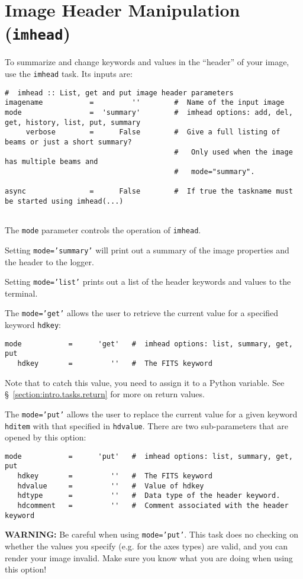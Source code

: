 \section{Image Header Manipulation ({\tt imhead})}
\label{section:analysis.imhead}

To summarize and change keywords and values in the ``header'' of
your image, use the {\tt imhead} task.  Its inputs are:
\small
\begin{verbatim}
#  imhead :: List, get and put image header parameters
imagename           =         ''        #  Name of the input image
mode                =  'summary'        #  imhead options: add, del, get, history, list, put, summary
     verbose        =      False        #  Give a full listing of beams or just a short summary? 
                                        #   Only used when the image has multiple beams and
                                        #   mode="summary".

async               =      False        #  If true the taskname must be started using imhead(...)


\end{verbatim}
\normalsize

The {\tt mode} parameter controls the operation of {\tt imhead}.

Setting {\tt mode='summary'} will print out a summary of the image
properties and the header to the logger.

Setting {\tt mode='list'} prints out a list of the header keywords
and values to the terminal.

The {\tt mode='get'} allows the user to retrieve the current value 
for a specified keyword {\tt hdkey}:
\small
\begin{verbatim}
mode           =      'get'   #  imhead options: list, summary, get, put
   hdkey       =         ''   #  The FITS keyword
\end{verbatim}
\normalsize
Note that to catch this value, you need to assign it to a Python
variable.
See \S~\ref{section:intro.tasks.return} for more on return values.

The {\tt mode='put'} allows the user to replace the current value 
for a given keyword {\tt hditem} with that specified in {\tt hdvalue}.  
There are two sub-parameters that are opened by this option:
\small
\begin{verbatim}
mode           =      'put'   #  imhead options: list, summary, get, put
   hdkey       =         ''   #  The FITS keyword
   hdvalue     =         ''   #  Value of hdkey
   hdtype      =         ''   #  Data type of the header keyword.
   hdcomment   =         ''   #  Comment associated with the header keyword

\end{verbatim}
\normalsize
{\bf WARNING:} Be careful when using {\tt mode='put'}.  This task does
no checking on whether the values you specify (e.g. for the axes
types) are valid, and you can render your image invalid.  Make sure you
know what you are doing when using this option!

